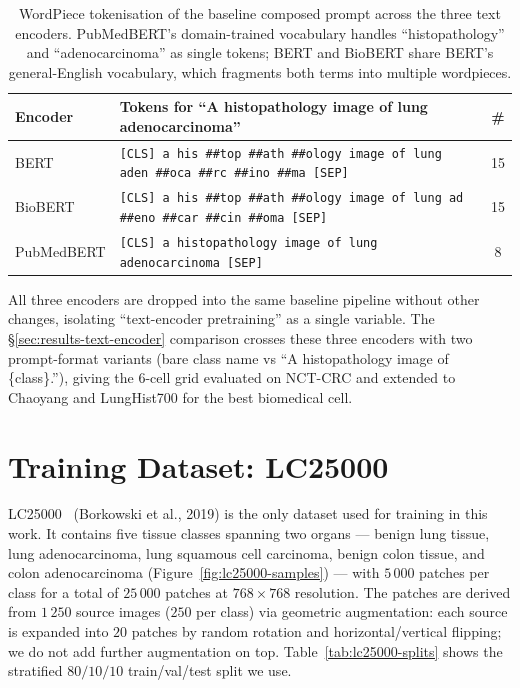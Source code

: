 \begin{table}[H]
    \centering
    \small
    \begin{tabular}{|l|p{}|c|}
    \hline
    \textbf{Encoder} & \textbf{Tokens for ``A histopathology image of lung adenocarcinoma''} & \textbf{\#} \\ \hline
    BERT       & \texttt{[CLS] a his \#\#top \#\#ath \#\#ology image of lung aden \#\#oca \#\#rc \#\#ino \#\#ma [SEP]} & 15 \\ \hline
    BioBERT    & \texttt{[CLS] a his \#\#top \#\#ath \#\#ology image of lung ad \#\#eno \#\#car \#\#cin \#\#oma [SEP]} & 15 \\ \hline
    PubMedBERT & \texttt{[CLS] a histopathology image of lung adenocarcinoma [SEP]} & 8 \\ \hline
    \end{tabular}
    \caption{WordPiece tokenisation of the baseline composed prompt across the three text encoders. PubMedBERT's domain-trained vocabulary handles ``histopathology'' and ``adenocarcinoma'' as single tokens; BERT and BioBERT share BERT's general-English vocabulary, which fragments both terms into multiple wordpieces.}
    \label{tab:bert-tokenization}
\end{table}

All three encoders are dropped into the same baseline pipeline without other changes, isolating ``text-encoder pretraining'' as a single variable. The §\ref{sec:results-text-encoder} comparison crosses these three encoders with two prompt-format variants (bare class name vs ``A histopathology image of \{class\}.''), giving the 6-cell grid evaluated on NCT-CRC and extended to Chaoyang and LungHist700 for the best biomedical cell.


\section{Training Dataset: LC25000}
\label{sec:meth-dataset}

LC25000~\cite{borkowski2019lc25000} (Borkowski et al., 2019) is the only dataset used for training in this work. It contains five tissue classes spanning two organs --- benign lung tissue, lung adenocarcinoma, lung squamous cell carcinoma, benign colon tissue, and colon adenocarcinoma (Figure~\ref{fig:lc25000-samples}) --- with $5\,000$ patches per class for a total of $25\,000$ patches at $768 \times 768$ resolution. The patches are derived from $1\,250$ source images ($250$ per class) via geometric augmentation: each source is expanded into $20$ patches by random rotation and horizontal/vertical flipping; we do not add further augmentation on top. Table~\ref{tab:lc25000-splits} shows the stratified $80/10/10$ train/val/test split we use.

